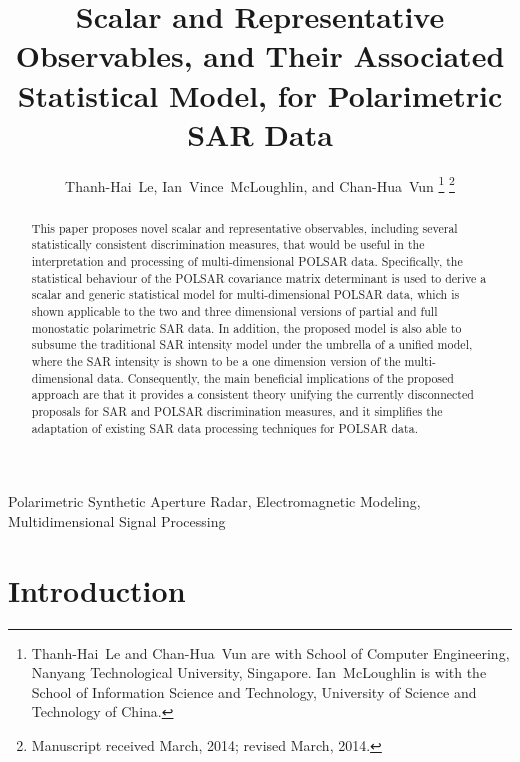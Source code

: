\documentclass[journal]{IEEEtran}
\title{
  Scalar and Representative Observables, and Their Associated Statistical Model, for Polarimetric SAR Data
}
\author{Thanh-Hai~Le,
        Ian~Vince~McLoughlin, 
	and Chan-Hua~Vun%
\thanks{Thanh-Hai~Le and Chan-Hua~Vun are with School of Computer Engineering, 
Nanyang Technological University, Singapore. Ian~McLoughlin is with the School of Information Science and Technology,
University of Science and Technology of China.
}%
\thanks{Manuscript received March, 2014; revised March, 2014.}}
\begin{document}
\maketitle

\begin{abstract}
This paper proposes novel scalar and representative observables, including several statistically consistent discrimination measures,
  that would be useful in the interpretation and processing of multi-dimensional POLSAR data.
Specifically, the statistical behaviour of the POLSAR covariance matrix determinant is used
  to derive a scalar and generic statistical model for multi-dimensional POLSAR data,
  which is shown applicable to the two and three dimensional versions of partial and full monostatic polarimetric SAR data.
In addition, the proposed model is also able to subsume the traditional SAR intensity model under the umbrella of a unified model,
  where the SAR intensity is shown to be a one dimension version of the multi-dimensional data.
Consequently, the main beneficial implications of the proposed approach are that
  it provides a consistent theory unifying the currently disconnected proposals for SAR and POLSAR discrimination measures,
  and it simplifies the adaptation of existing SAR data processing techniques for POLSAR data.
\end{abstract}

\begin{IEEEkeywords}
Polarimetric Synthetic Aperture Radar, Electromagnetic Modeling, Multidimensional Signal Processing  
\end{IEEEkeywords}

\IEEEpeerreviewmaketitle

\section{Introduction}
\end{document}

